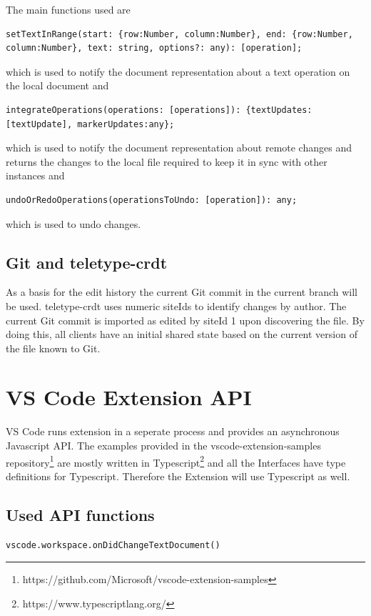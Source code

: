 The main functions used are

\begin{lstlisting}
setTextInRange(start: {row:Number, column:Number}, end: {row:Number, column:Number}, text: string, options?: any): [operation];
\end{lstlisting}
which is used to notify the document representation about a text operation on the local document and
\begin{lstlisting}
integrateOperations(operations: [operations]): {textUpdates:[textUpdate], markerUpdates:any};
\end{lstlisting}
which is used to notify the document representation about remote changes and returns the changes to the local file required to keep it in sync with other instances
and
\begin{lstlisting}
undoOrRedoOperations(operationsToUndo: [operation]): any;
\end{lstlisting}
which is used to undo changes.

\subsection{Git and teletype-crdt}
As a basis for the edit history  the current Git commit in the current branch will be used. teletype-crdt uses numeric siteIds to identify changes by author. The current Git commit is imported as edited by siteId 1 upon discovering the file. By doing this, all clients have an initial shared state based on the current version of the file known to Git.

\section{VS Code Extension API}

VS Code runs extension in a seperate process and provides an asynchronous Javascript API.
The examples provided in the vscode-extension-samples repository\footnote{https://github.com/Microsoft/vscode-extension-samples} are mostly written in Typescript\footnote{https://www.typescriptlang.org/} and all the Interfaces have type definitions for Typescript.
Therefore the Extension will use Typescript as well.

\subsection{Used API functions}

\begin{lstlisting}
vscode.workspace.onDidChangeTextDocument()
\end{lstlisting}

